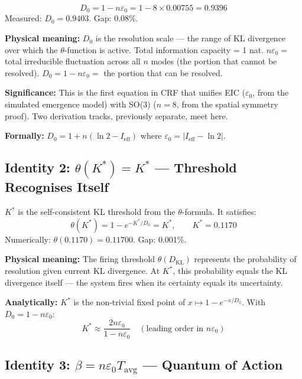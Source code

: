 \documentclass[12pt, a4paper]{article}
\begin{document}
\begin{derivedbox}[title={$D_0 = 1 - n\varepsilon_0$ --- Resolution Scale Unified (0.08\%)}]
\[
D_0 = 1 - n\varepsilon_0 = 1 - 8 \times 0.00755 = 0.9396
\]
Measured: $D_0 = 0.9403$. Gap: 0.08\%.

\textbf{Physical meaning:} $D_0$ is the resolution scale --- the range of KL divergence
over which the $\theta$-function is active. Total information capacity = 1 nat.
$n\varepsilon_0 = $ total irreducible fluctuation across all $n$ modes (the portion that
cannot be resolved). $D_0 = 1 - n\varepsilon_0 = $ the portion that can be resolved.

\textbf{Significance:} This is the first equation in CRF that unifies EIC ($\varepsilon_0$,
from the simulated emergence model) with SO(3) ($n = 8$, from the spatial symmetry proof).
Two derivation tracks, previously separate, meet here.

\textbf{Formally:} $D_0 = 1 + n(\ln 2 - I_{\mathrm{eff}})$ where
$\varepsilon_0 = |I_{\mathrm{eff}} - \ln 2|$.
\end{derivedbox}

\subsection{Identity 2: $\theta(K^*) = K^*$ --- Threshold Recognises Itself}

\begin{derivedbox}[title={$\theta(K^*) = K^*$ --- Self-Referential Fixed Point (0.001\%)}]
$K^*$ is the self-consistent KL threshold from the $\theta$-formula. It satisfies:
\[
\theta(K^*) = 1 - e^{-K^*/D_0} = K^*, \qquad K^* = 0.1170
\]
Numerically: $\theta(0.1170) = 0.11700$. Gap: 0.001\%.

\textbf{Physical meaning:} The firing threshold $\theta(D_{\mathrm{KL}})$ represents the
probability of resolution given current KL divergence. At $K^*$, this probability equals
the KL divergence itself --- the system fires when its certainty equals its uncertainty.

\textbf{Analytically:} $K^*$ is the non-trivial fixed point of $x \mapsto 1 - e^{-x/D_0}$.
With $D_0 = 1 - n\varepsilon_0$:
\[
K^* \approx \frac{2n\varepsilon_0}{1 - n\varepsilon_0} \quad (\text{leading order in } n\varepsilon_0)
\]
\end{derivedbox}

\subsection{Identity 3: $\beta = n\varepsilon_0 T_{\mathrm{avg}}$ --- Quantum of Action}
\end{document}
